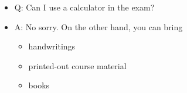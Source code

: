 \begin{frame}{\LectureFeedbackLectureTitle}
  \begin{itemize}
  \item Q: Can I use a calculator in the exam?
    \vspace{0.5cm}
  \item A: No sorry. On the other hand, you can bring
    \vspace{0.5cm}
    \begin{itemize}
    \item handwritings
      \vspace{0.25cm}
    \item printed-out course material
      \vspace{0.25cm}
    \item books
    \end{itemize}
  \end{itemize}
\end{frame}
